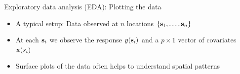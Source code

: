 \begin{frame}{Exploratory data analysis (EDA): Plotting the data}
	\begin{itemize}
		\item A typical setup: Data observed at $n$ locations $\{\textbf{s}_1,\ldots,\textbf{s}_n\}$
		\item At each $\textbf{s}_i$ we observe the response $y(\textbf{s}_i)$ and a $p\times 1$ vector of covariates $\textbf{x}(s_i)$
		\item \alert{Surface plots} of the data often helps to understand spatial patterns
	\end{itemize}
	\vskip-7mm\begin{figure}

\end{figure}
\end{frame}
